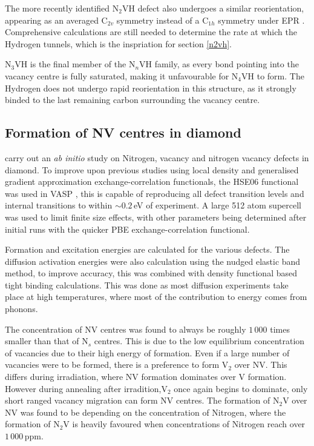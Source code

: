 \documentclass[10pt,a4paper,twocolumn,twoside]{extarticle}
\begin{document}
The more recently identified N$_{2}$VH defect also undergoes a similar reorientation, appearing as an averaged C$_{2v}$ symmetry instead of a C$_{1h}$ symmetry under EPR \cite{Peaker}. Comprehensive calculations are still needed to determine the rate at which the Hydrogen tunnels, which is the inspriation for section \ref{n2vh}. 

N$_{3}$VH is the final member of the N$_{n}$VH family, as every bond pointing into the vacancy centre is fully saturated, making it unfavourable for N$_{4}$VH to form. The Hydrogen does not undergo rapid reorientation in this structure, as it strongly binded to the last remaining carbon surrounding the vacancy centre. 

\subsection{Formation of NV centres in diamond}
\textcite{Deak} carry out an \emph{ab initio} study on Nitrogen, vacancy and nitrogen vacancy defects in diamond. To improve upon previous studies using local density and generalised gradient approximation exchange-correlation functionals, the HSE$06$ functional \cite{HSE06} was used in VASP \cite{VASP}, this is capable of reproducing all defect transition levels and internal transitions to within $\sim0.2$\,eV of experiment. A large 512 atom supercell was used to limit finite size effects, with other parameters being determined after initial runs with the quicker PBE exchange-correlation functional. 

Formation and excitation energies are calculated for the various defects. The diffusion activation energies were also calculation using the nudged elastic band method, to improve accuracy, this was combined with density functional based tight binding calculations. This was done as most diffusion experiments take place at high temperatures, where most of the contribution to energy comes from phonons. 

The concentration of NV centres was found to always be roughly $1\,000$ times smaller than that of N$_s$ centres. This is due to the low equilibrium concentration of vacancies due to their high energy of formation. Even if a large number of vacancies were to be formed, there is a preference to form V$_2$ over NV. This differs during irradiation, where NV formation dominates over V formation. However during annealing after irradition,V$_2$ once again begins to dominate, only short ranged vacancy migration can form NV centres.
The formation of N$_2$V over NV was found to be depending on the concentration of Nitrogen, where the formation of N$_2$V is heavily favoured when concentrations of Nitrogen reach over $1\,000$\,ppm.
\end{document}
